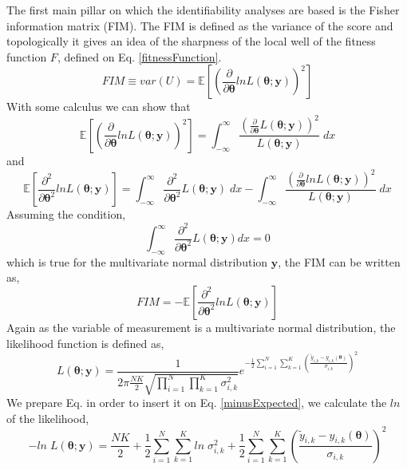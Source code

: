 \documentclass[a4paper, 11pt]{article}
\newcommand{\field}[1]{\mathbb{#1}} %
\begin{document}
The first main pillar on which the identifiability analyses are based is the Fisher information matrix (FIM).
The FIM is defined as the variance of the score and topologically it gives an idea of the sharpness of the local well of the fitness function $F$, defined on Eq. \ref{fitnessFunction}.
\begin{equation}
  FIM \equiv var(U) = \field{E}\left[\left(\frac{\partial}{\partial \bm{\theta}} ln L(\bm{\theta};\bm{y})\right)^2\right]
\end{equation}
With some calculus we can show that
\begin{equation}
  \field{E}\left[\left(\frac{\partial}{\partial \bm{\theta}} ln L(\bm{\theta};\bm{y})\right)^2\right] = 
  \int_{-\infty}^{\infty} \frac{\left(\frac{\partial}{\partial\bm{\theta}}L(\bm{\theta};\bm{y})\right)^2}{L(\bm{\theta};\bm{y})}\;dx
\end{equation}
and 
\begin{equation}
  \field{E}\left[\frac{\partial^2}{\partial \bm{\theta}^2} ln L(\bm{\theta};\bm{y})\right] = 
  \int_{-\infty}^{\infty} \frac{\partial^2}{\partial\bm{\theta}^2}L(\bm{\theta};\bm{y})\;dx -
  \int_{-\infty}^{\infty} \frac{\left(\frac{\partial}{\partial \bm{\theta}} ln L(\bm{\theta};\bm{y})\right)^2}{L(\bm{\theta};\bm{y})}\;dx
\end{equation}
Assuming the condition, 
\begin{equation}
  \int_{-\infty}^{\infty} \frac{\partial^2}{\partial \bm{\theta}^2} L(\bm{\theta};\bm{y})dx = 0
\end{equation}
which is true for the multivariate normal distribution $\bm{y}$, the FIM can be written as, 
\begin{equation} \label{minusExpected}
  FIM=-\field{E}\left[\frac{\partial^2}{\partial \bm{\theta}^2} ln L (\bm{\theta};\bm{y})\right]
\end{equation}
Again as the variable of measurement is a multivariate normal distribution, the likelihood function is defined as, 
\begin{equation} \label{likelihood}
  L(\bm{\theta};\bm{y})=\frac{1}{2\pi\frac{NK}{2}\sqrt{\displaystyle\prod_{i=1}^{N}\prod_{k=1}^{K}\sigma_{i,k}^{2}}}e^{-\frac{1}{2}\displaystyle\sum_{i=1}^{N}\sum_{k=1}^{K}\left(\frac{\tilde{y}_{i,k}-y_{i,k}(\bm{\theta})}{\sigma_{i,k}}\right)^2}
\end{equation}
We prepare Eq. \label{likelihood} in order to insert it on Eq. \ref{minusExpected}, we calculate the $ln$ of the likelihood, 
\begin{equation}
  -ln\;L(\bm{\theta};\bm{y})=\frac{NK}{2}+\frac{1}{2}\sum_{i=1}^{N}\sum_{k=1}^{K}ln\;\sigma_{i,k}^2+\frac{1}{2}\sum_{i=1}^{N}\sum_{k=1}^{K}\left(\frac{\tilde{y}_{i,k}-y_{i,k}(\bm{\theta})}{\sigma_{i,k}}\right)^2
\end{equation}
\end{document}
